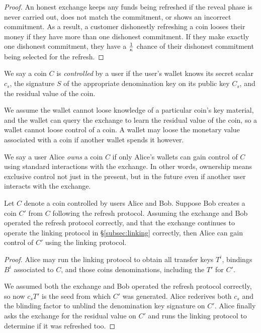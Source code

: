 \documentclass[sigconf, authordraft]{acmart}
\begin{document}
\begin{proof}
An honest exchange keeps any funds being refreshed if the reveal
phase is never carried out, does not match the commitment, or shows
an incorrect commitment.  As a result, a customer dishonestly
refreshing a coin looses their money if they have more than one
dishonest commitment.  If they make exactly one dishonest
commitment, they have a $1 \over \kappa$ chance of their
dishonest commitment being selected for the refresh.
\end{proof}

We say a coin $C$ is {\em controlled} by a user if the user's wallet knows
its secret scalar $c_s$, the signature $S$ of the appropriate denomination
key on its public key $C_s$, and the residual value of the coin.

We assume the wallet cannot loose knowledge of a particular coin's
key material, and the wallet can query the exchange to learn the
residual value of the coin, so a wallet cannot loose control of
a coin.  A wallet may loose the monetary value associated with a coin
if another wallet spends it however.

We say a user Alice {\em owns} a coin $C$ if only Alice's wallets can
gain control of $C$ using standard interactions with the exchange.
In other words, ownership means exclusive control not just in the
present, but in the future even if another user interacts with the
exchange.

\begin{theorem}
Let $C$ denote a coin controlled by users Alice and Bob.
Suppose Bob creates a coin $C'$ from $C$ following the refresh protocol.
Assuming the exchange and Bob operated the refresh protocol correctly,
and that the exchange continues to operate the linking protocol
in \S\ref{subsec:linking} correctly,
then Alice can gain control of $C'$ using the linking protocol.
\end{theorem}

\begin{proof}
Alice may run the linking protocol to obtain all transfer keys $T^i$,
bindings $B^i$ associated to $C$, and those coins denominations,
including the $T'$ for $C'$.

We assumed both the exchange and Bob operated the refresh protocol
correctly, so now $c_s T'$ is the seed from which $C'$ was generated.
Alice rederives both $c_s$ and the blinding factor to unblind the
denomination key signature on $C'$.  Alice finally asks the exchange
for the residual value on $C'$ and runs the linking protocol to
determine if it was refreshed too.
\end{proof}
\end{document}
